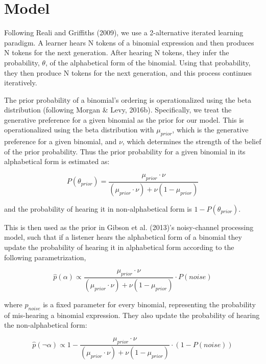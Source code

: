 \documentclass[
  jou,floatsintext]{apa6}
\begin{document}
\section{Model}\label{model}

Following Reali and Griffiths (2009), we use a 2-alternative iterated learning paradigm. A learner hears N tokens of a binomial expression and then produces N tokens for the next generation. After hearing N tokens, they infer the probability, \(\theta\), of the alphabetical form of the binomial. Using that probability, they then produce N tokens for the next generation, and this process continues iteratively.

The prior probability of a binomial's ordering is operationalized using the beta distribution (following Morgan \& Levy, 2016b). Specifically, we treat the generative preference for a given binomial as the prior for our model. This is operationalized using the beta distribution with \(\mu_{prior}\), which is the generative preference for a given binomial, and \(\nu\), which determines the strength of the belief of the prior probability. Thus the prior probability for a given binomial in its alphabetical form is estimated as:

\begin{equation}
\label{eq:thetaPrior}
P(\theta_{prior}) = \frac{\mu_{prior} \cdot \nu}{(\mu_{prior} \cdot \nu) + \nu(1 - \mu_{prior})}
\end{equation}

and the probability of hearing it in non-alphabetical form is \(1-P(\theta_{prior})\).

This is then used as the prior in Gibson et al. (2013)'s noisy-channel processing model, such that if a listener hears the alphabetical form of a binomial they update the probability of hearing it in alphabetical form according to the following parametrization,

\begin{equation}
\label{eq:phatAlpha}
\hat{p}(\alpha) \propto \frac{\mu_{prior} \cdot \nu}{(\mu_{prior} \cdot \nu) + \nu(1 - \mu_{prior})} \cdot P(noise)
\end{equation}

where \(p_{noise}\) is a fixed parameter for every binomial, representing the probability of mis-hearing a binomial expression. They also update the probability of hearing the non-alphabetical form:

\begin{equation}
\label{eq:phatNonalpha}
\hat{p}(\neg\alpha) \propto 1 - \frac{\mu_{prior} \cdot \nu}{(\mu_{prior} \cdot \nu) + \nu(1 - \mu_{prior})} \cdot (1-P(noise))
\end{equation}
\end{document}
